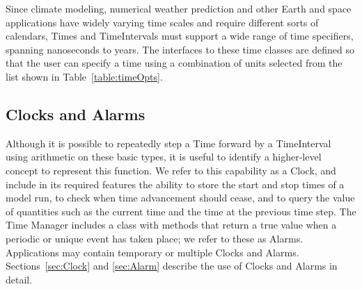 Since climate modeling, numerical weather prediction and other 
Earth and space applications have widely varying time scales and require 
different sorts of calendars, Times and TimeIntervals must support 
a wide range of time specifiers, spanning nanoseconds to years.  The
interfaces to these time classes are defined so that the user can specify a time
using a combination of units selected from the list shown in 
Table~\ref{table:timeOpts}.  

\subsection{Clocks and Alarms}
Although it is possible to repeatedly step a Time forward by a 
TimeInterval using arithmetic on these basic types, it is useful to 
identify a higher-level concept to represent this function.  We refer to 
this capability as a Clock, and include in its required features the 
ability to store the start and stop times of 
a model run, to check when time advancement should cease, 
and to query the value of quantities such as the current time and the
time at the previous time step.  The Time Manager includes a class 
with methods that return a true value when a periodic or unique event 
has taken place; we refer to these as Alarms.  Applications may contain 
temporary or multiple Clocks and Alarms.  Sections~\ref{sec:Clock} and
\ref{sec:Alarm} describe the use of Clocks and Alarms in detail.






